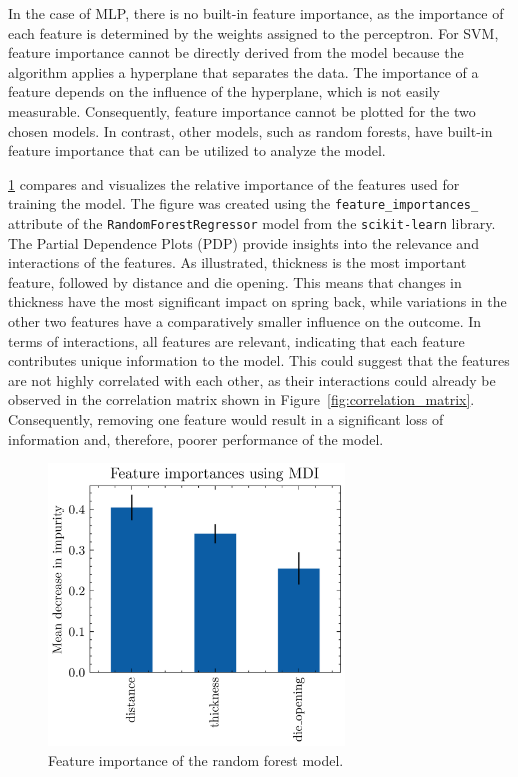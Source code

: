 In the case of \ac{MLP}, there is no built-in feature importance, as the importance of each feature is determined by
the weights assigned to the perceptron.
For \ac{SVM}, feature importance cannot be directly derived from the model
because the algorithm applies a hyperplane that separates the data.
The importance of a feature depends on the influence of the hyperplane, which is not easily measurable.
Consequently, feature importance cannot be plotted for
the two chosen models.
In contrast, other models, such as random forests, have built-in feature importance that can
be utilized to analyze the model.


\ref{fig:feature-importances-rf1} compares and visualizes the relative importance of the features used for
training the model.
The figure was created using the \texttt{feature\_importances\_} attribute of the \texttt{RandomForestRegressor}
model from the \texttt{scikit-learn} library.
The Partial Dependence Plots (PDP) provide insights into the relevance and interactions of the
features.
As illustrated, thickness is the most important feature, followed by distance and die opening.
This means that changes in thickness have the most significant impact on spring back, while variations in the other
two features
have a comparatively smaller influence on the outcome.
In terms of interactions, all features are relevant, indicating that each feature contributes unique information to
the model.
This could suggest that the features are not highly correlated with each other, as their interactions
could already be observed in the correlation matrix shown in Figure~\ref{fig:correlation_matrix}.
Consequently, removing one feature would result in a significant loss of information and, therefore, poorer
performance of the model.

\begin{figure}[h]
    \begin{tcolorbox}[arc=0pt,boxrule=0.5pt]
        \centering
        \includegraphics[width=0.7\textwidth]{chap5/images/rf_feature_importances}
    \end{tcolorbox}
    \caption{Feature importance of the random forest model.}
    \label{fig:feature-importances-rf1}
\end{figure}

